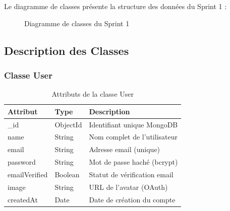 Le diagramme de classes présente la structure des données du Sprint 1 :

\begin{figure}[H]
    \centering
    \caption{Diagramme de classes du Sprint 1}
    \label{fig:classes-sprint1}
\end{figure}

\subsection{Description des Classes}

\subsubsection{Classe User}

\begin{table}[H]
\centering
\caption{Attributs de la classe User}
\label{tab:class-user}
\begin{tabular}{|l|l|p{6cm}|}
\hline
\textbf{Attribut} & \textbf{Type} & \textbf{Description} \\
\hline
\_id & ObjectId & Identifiant unique MongoDB \\
\hline
name & String & Nom complet de l'utilisateur \\
\hline
email & String & Adresse email (unique) \\
\hline
password & String & Mot de passe haché (bcrypt) \\
\hline
emailVerified & Boolean & Statut de vérification email \\
\hline
image & String & URL de l'avatar (OAuth) \\
\hline
createdAt & Date & Date de création du compte \\
\hline
\end{tabular}
\end{table}

